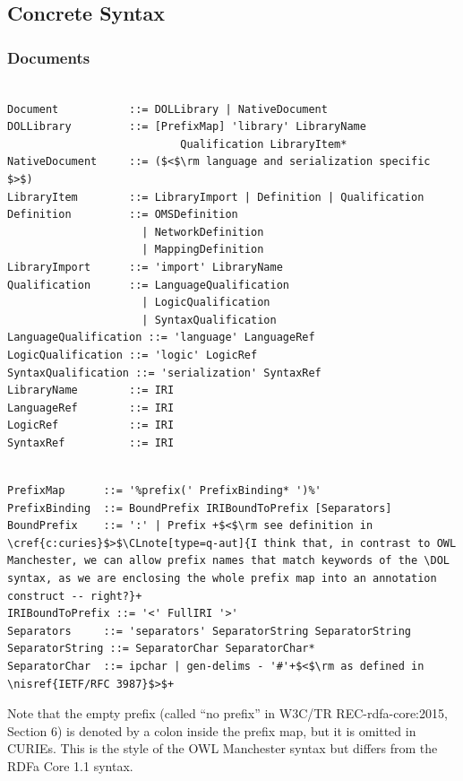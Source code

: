\documentclass[10pt,fleqn,final]{scrreprt}
\makeatletter
\newcommand*\CommentAuthor{}
\renewcommand*\CommentAuthor{#1}}
\newcommand*\CommentDate{}
\renewcommand*\CommentDate{#1}}
\newcommand*\CommentId{}
\renewcommand*\CommentId{#1}}
\newcommand*\CommentType{}
\renewcommand*\CommentType{#1}}
\newcommand*{\SetCommentColorByType}[1]{%
\edef\localType{{#1}}%
\expandafter\ifstrequal\localType{q-aut}{\colorlet{CommentColor}{red}}{%
\expandafter\ifstrequal\localType{q-all}{\colorlet{CommentColor}{orange}}{%
\expandafter\ifstrequal\localType{todo}{\colorlet{CommentColor}{orange}}{%
\expandafter\ifstrequal\localType{fyi}{\colorlet{CommentColor}{lightgray}}{%
\colorlet{CommentColor}{yellow}}}}}}
\newcommand*{\SetCommentPrefixByType}[1]{%
\edef\localType{{#1}}%
\expandafter\@ifmtarg\localType{%
\edef\CommentPrefix{}%
}{%
\caseupper[q]{#1}%
\edef\CommentPrefix{\thestring: }%
}}
\newcommand*{\initComment}[1]{%
\setkeys{Comment}{#1}%
\SetCommentColorByType{\CommentType}%
\relax%
\SetCommentPrefixByType{\CommentType}%
\relax%
}
\newcommand*{\todonote}[2][]{%
\initComment{#1}%
\pdfcomment[author=\CommentAuthor,color=CommentColor,date=\CommentDate,id=\CommentId]{%
\CommentPrefix
#2}}
\renewcommand*{\todonote}[2][]{%
\initComment{#1}%
\ednote{\CommentPrefix #2}}
\newcommand*{\CLnote}[2][author=Christoph Lange]{%
\todonote[author=Christoph Lange,#1]{#2} 
}
\newcommand*{\DOL}{\ensuremath{\mathsf{DOL}}\xspace}
\newcommand{\clauserefname}{clause}
\newcommand{\cref}[1]{\clauserefname~\ref{#1}}
\newcommand{\ssclause}[1]{\subsection{#1}}
\newcommand{\sssclause}[1]{\subsubsection{#1}}
\newcommand{\nisref}[1]{#1}
\newenvironment{definitions}[0]{\medskip }{}
\makeatother
\begin{document}
\begin{definitions}

\ssclause{Concrete Syntax}

	\sssclause{Documents}
\vspace{-2em}
\begin{lstlisting}[language=ebnf,escapeinside={()},morecomment={[l]{\%\%\ }}]

Document           ::= DOLLibrary | NativeDocument
DOLLibrary         ::= [PrefixMap] 'library' LibraryName
                           Qualification LibraryItem*
NativeDocument     ::= ($<$\rm language and serialization specific $>$) 
LibraryItem        ::= LibraryImport | Definition | Qualification
Definition         ::= OMSDefinition
                     | NetworkDefinition
                     | MappingDefinition
LibraryImport      ::= 'import' LibraryName
Qualification      ::= LanguageQualification
                     | LogicQualification
                     | SyntaxQualification
LanguageQualification ::= 'language' LanguageRef
LogicQualification ::= 'logic' LogicRef
SyntaxQualification ::= 'serialization' SyntaxRef
LibraryName        ::= IRI
LanguageRef        ::= IRI
LogicRef           ::= IRI
SyntaxRef          ::= IRI
\end{lstlisting}


\begin{lstlisting}[language=ebnf,escapechar=+,morecomment={[l]{\%\%\ }}]

PrefixMap      ::= '%prefix(' PrefixBinding* ')%'
PrefixBinding  ::= BoundPrefix IRIBoundToPrefix [Separators]
BoundPrefix    ::= ':' | Prefix +$<$\rm see definition in \cref{c:curies}$>$\CLnote[type=q-aut]{I think that, in contrast to OWL Manchester, we can allow prefix names that match keywords of the \DOL syntax, as we are enclosing the whole prefix map into an annotation construct -- right?}+
IRIBoundToPrefix ::= '<' FullIRI '>'
Separators     ::= 'separators' SeparatorString SeparatorString
SeparatorString ::= SeparatorChar SeparatorChar*
SeparatorChar  ::= ipchar | gen-delims - '#'+$<$\rm as defined in \nisref{IETF/RFC 3987}$>$+
\end{lstlisting}


 Note that the empty prefix (called ``no prefix'' in \nisref{W3C/TR REC-rdfa-core:2015, Section 6}) is denoted by a colon inside the prefix map, but it is omitted in CURIEs.  This is the style of the OWL Manchester syntax \cite{W3C:NOTE-owl2-manchester-syntax-20091027} but differs from the RDFa Core 1.1 syntax.

\vspace{1em}
	


\end{definitions}
\end{document}
